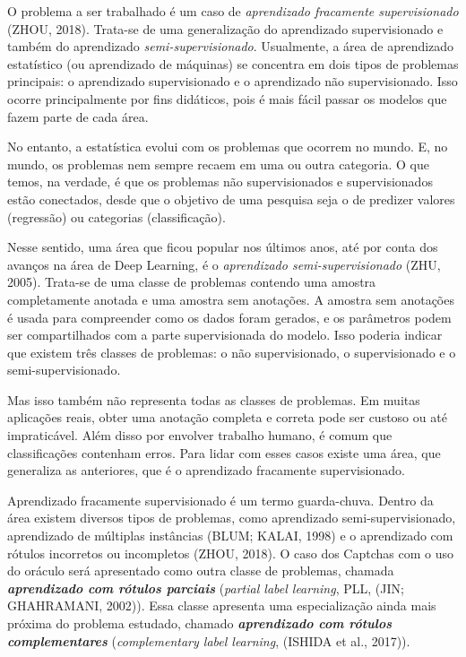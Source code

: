 \documentclass[12pt,twoside,brazilian]{book}
\begin{document}
O problema a ser trabalhado é um caso de \emph{aprendizado fracamente
supervisionado} (ZHOU, 2018). Trata-se de uma generalização do
aprendizado supervisionado e também do aprendizado
\emph{semi-supervisionado}. Usualmente, a área de aprendizado
estatístico (ou aprendizado de máquinas) se concentra em dois tipos de
problemas principais: o aprendizado supervisionado e o aprendizado não
supervisionado. Isso ocorre principalmente por fins didáticos, pois é
mais fácil passar os modelos que fazem parte de cada área.

No entanto, a estatística evolui com os problemas que ocorrem no mundo.
E, no mundo, os problemas nem sempre recaem em uma ou outra categoria. O
que temos, na verdade, é que os problemas não supervisionados e
supervisionados estão conectados, desde que o objetivo de uma pesquisa
seja o de predizer valores (regressão) ou categorias (classificação).

Nesse sentido, uma área que ficou popular nos últimos anos, até por
conta dos avanços na área de Deep Learning, é o \emph{aprendizado
semi-supervisionado} (ZHU, 2005). Trata-se de uma classe de problemas
contendo uma amostra completamente anotada e uma amostra sem anotações.
A amostra sem anotações é usada para compreender como os dados foram
gerados, e os parâmetros podem ser compartilhados com a parte
supervisionada do modelo. Isso poderia indicar que existem três classes
de problemas: o não supervisionado, o supervisionado e o
semi-supervisionado.

Mas isso também não representa todas as classes de problemas. Em muitas
aplicações reais, obter uma anotação completa e correta pode ser custoso
ou até impraticável. Além disso por envolver trabalho humano, é comum
que classificações contenham erros. Para lidar com esses casos existe
uma área, que generaliza as anteriores, que é o aprendizado fracamente
supervisionado.

Aprendizado fracamente supervisionado é um termo guarda-chuva. Dentro da
área existem diversos tipos de problemas, como aprendizado
semi-supervisionado, aprendizado de múltiplas instâncias (BLUM; KALAI,
1998) e o aprendizado com rótulos incorretos ou incompletos (ZHOU,
2018). O caso dos Captchas com o uso do oráculo será apresentado como
outra classe de problemas, chamada \textbf{\emph{aprendizado com rótulos
parciais}} (\emph{partial label learning}, PLL, (JIN; GHAHRAMANI,
2002)). Essa classe apresenta uma especialização ainda mais próxima do
problema estudado, chamado \textbf{\emph{aprendizado com rótulos
complementares}} (\emph{complementary label learning}, (ISHIDA et al.,
2017)).
\end{document}
